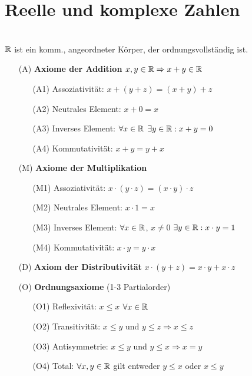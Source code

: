 \section{Reelle und komplexe Zahlen}

 \\
$\mathbb{R}$ ist ein komm., angeordneter Körper, der ordnungsvollständig ist.

\begin{multicols}{2}
\tiny
\begin{itemize}
\itemsep0em 
	\item[(A)]{\textbf{Axiome der Addition} $x,y \in \mathbb{R} \Rightarrow x + y \in \mathbb{R}$}
	\begin{itemize}
	\itemsep0em 
		\item[(A1)]{Assoziativität: $x + (y + z) = (x + y) + z$}
		\item[(A2)]{Neutrales Element: $x + 0 = x$}
		\item[(A3)]{Inverses Element: $\forall x \in \mathbb{R}$ $\exists y \in \mathbb{R} :x + y = 0$}
		\item[(A4)]{Kommutativität: $x + y = y + x$}
	\end{itemize}
	\item[(M)]{\textbf{Axiome der Multiplikation}}
	\begin{itemize}
	\itemsep0em 
		\item[(M1)]{Assoziativität: $x \cdot (y \cdot z) = (x \cdot y) \cdot z$}
		\item[(M2)]{Neutrales Element: $x \cdot 1 = x$}
		\item[(M3)]{Inverses Element: $\forall x \in \mathbb{R}$, $x \neq 0$ $\exists y \in \mathbb{R} :x \cdot y = 1$}
		\item[(M4)]{Kommutativität: $x \cdot y = y \cdot x$}
	\end{itemize}
	\item[(D)]{\textbf{Axiom der Distributivität} $x \cdot (y + z) = x \cdot y + x \cdot z$}
	\item[(O)]{\textbf{Ordnungsaxiome} (1-3 Partialorder)}
	\begin{itemize}
	\itemsep0em 
		\item[(O1)]{Reflexivität: $x \leq x$ $\forall x \in \mathbb{R}$}
		\item[(O2)]{Transitivität: $x \leq y$ und $y \leq z \Rightarrow x \leq z$}
		\item[(O3)]{Antisymmetrie: $x \leq y$ und $y \leq x \Rightarrow x = y$}
		\item[(O4)]{Total: $\forall x,y \in \mathbb{R}$ gilt entweder $y \leq x$ oder $x \leq y$}

\end{itemize}
\end{itemize}
\end{multicols}
